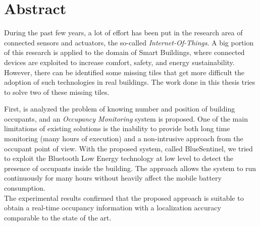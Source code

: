 %
\cleardoublepage
%
{}
%
%
%
\chapter*{Abstract}
%
During the past few years, a lot of effort has been put in the research area of connected sensors and actuators, the so-called \emph{Internet-Of-Things}. A big portion of this research is applied to the domain of Smart Buildings, where connected devices are exploited to increase comfort, safety, and energy sustainability.
However, there can be identified some missing tiles that get more difficult the adoption of such technologies in real buildings.
The work done in this thesis tries to solve two of these missing tiles.

First, is analyzed the problem of knowing number and position of building occupants, and an \emph{Occupancy Monitoring} system is proposed. One of the main limitations of existing solutions is the inability to provide both long time monitoring (many hours of execution) and a non-intrusive approach from the occupant point of view.
With the proposed system, called BlueSentinel, we tried to exploit the Bluetooth Low Energy technology at low level to detect the presence of occupants inside the building. The approach allows the system to run continuously for many hours without heavily affect the mobile battery consumption.\\
The experimental results confirmed that the proposed approach is suitable to obtain a real-time occupancy information with a localization accuracy comparable to the state of the art.

